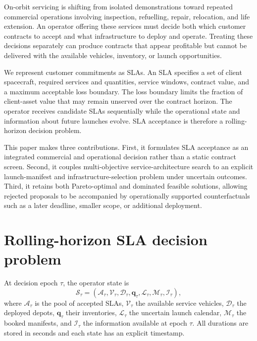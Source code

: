 \documentclass[review,12pt,authoryear]{elsarticle}
\newcommand{\state}{\mathcal{S}}
\begin{document}
On-orbit servicing is shifting from isolated demonstrations toward repeated
commercial operations involving inspection, refuelling, repair, relocation,
and life extension. An operator offering these services must decide both which
customer contracts to accept and what infrastructure to deploy and operate.
Treating these decisions separately can produce contracts that appear
profitable but cannot be delivered with the available vehicles, inventory, or
launch opportunities.

We represent customer commitments as SLAs. An SLA specifies a set of client
spacecraft, required services and quantities, service windows, contract value,
and a maximum acceptable loss boundary. The loss boundary limits the fraction
of client-asset value that may remain unserved over the contract horizon. The
operator receives candidate SLAs sequentially while the operational state and
information about future launches evolve. SLA acceptance is therefore a
rolling-horizon decision problem.

This paper makes three contributions. First, it formulates SLA acceptance as an
integrated commercial and operational decision rather than a static contract
screen. Second, it couples multi-objective service-architecture search to an
explicit launch-manifest and infrastructure-selection problem under uncertain
outcomes. Third, it retains both Pareto-optimal and dominated feasible
solutions, allowing rejected proposals to be accompanied by operationally
supported counterfactuals such as a later deadline, smaller scope, or additional
deployment.

\section{Rolling-horizon SLA decision problem}
\label{sec:problem}

At decision epoch $\tau$, the operator state is
\begin{equation}
 \state_\tau=(\mathcal{A}_\tau,\mathcal{V}_\tau,\mathcal{D}_\tau,
 \mathbf{q}_\tau,\mathcal{L}_\tau,\mathcal{M}_\tau,\mathcal{I}_\tau),
\end{equation}
where $\mathcal{A}_\tau$ is the pool of accepted SLAs,
$\mathcal{V}_\tau$ the available service vehicles,
$\mathcal{D}_\tau$ the deployed depots, $\mathbf{q}_\tau$ their inventories,
$\mathcal{L}_\tau$ the uncertain launch calendar, $\mathcal{M}_\tau$ the booked
manifests, and $\mathcal{I}_\tau$ the information available at epoch $\tau$.
All durations are stored in seconds and each state has an explicit timestamp.
\end{document}
